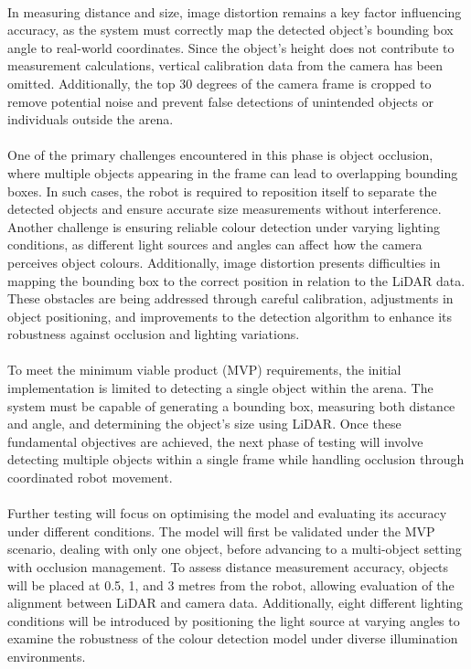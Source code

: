\paragraph*{}
In measuring distance and size, image distortion remains a key factor influencing accuracy, as the system must correctly map the detected object’s bounding box angle to real-world coordinates. Since the object’s height does not contribute to measurement calculations, vertical calibration data from the camera has been omitted. Additionally, the top 30 degrees of the camera frame is cropped to remove potential noise and prevent false detections of unintended objects or individuals outside the arena.

\paragraph*{}
One of the primary challenges encountered in this phase is object occlusion, where multiple objects appearing in the frame can lead to overlapping bounding boxes. In such cases, the robot is required to reposition itself to separate the detected objects and ensure accurate size measurements without interference. Another challenge is ensuring reliable colour detection under varying lighting conditions, as different light sources and angles can affect how the camera perceives object colours. Additionally, image distortion presents difficulties in mapping the bounding box to the correct position in relation to the LiDAR data. These obstacles are being addressed through careful calibration, adjustments in object positioning, and improvements to the detection algorithm to enhance its robustness against occlusion and lighting variations.

\paragraph*{}
To meet the minimum viable product (MVP) requirements, the initial implementation is limited to detecting a single object within the arena. The system must be capable of generating a bounding box, measuring both distance and angle, and determining the object's size using LiDAR. Once these fundamental objectives are achieved, the next phase of testing will involve detecting multiple objects within a single frame while handling occlusion through coordinated robot movement.

\paragraph*{}
Further testing will focus on optimising the model and evaluating its accuracy under different conditions. The model will first be validated under the MVP scenario, dealing with only one object, before advancing to a multi-object setting with occlusion management. To assess distance measurement accuracy, objects will be placed at 0.5, 1, and 3 metres from the robot, allowing evaluation of the alignment between LiDAR and camera data. Additionally, eight different lighting conditions will be introduced by positioning the light source at varying angles to examine the robustness of the colour detection model under diverse illumination environments.
